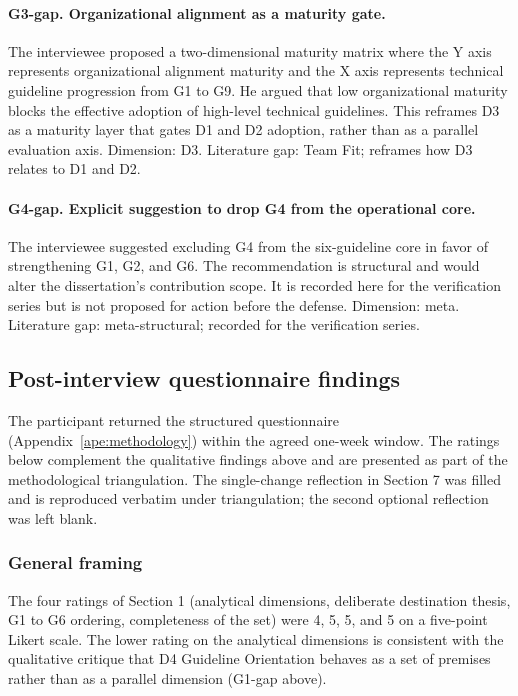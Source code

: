 \paragraph*{G3-gap. Organizational alignment as a maturity gate.} The interviewee proposed a two-dimensional maturity matrix where the Y axis represents organizational alignment maturity and the X axis represents technical guideline progression from G1 to G9. He argued that low organizational maturity blocks the effective adoption of high-level technical guidelines. This reframes D3 as a maturity layer that gates D1 and D2 adoption, rather than as a parallel evaluation axis. Dimension: D3. Literature gap: Team Fit; reframes how D3 relates to D1 and D2.

\paragraph*{G4-gap. Explicit suggestion to drop G4 from the operational core.} The interviewee suggested excluding G4 from the six-guideline core in favor of strengthening G1, G2, and G6. The recommendation is structural and would alter the dissertation's contribution scope. It is recorded here for the verification series but is not proposed for action before the defense. Dimension: meta. Literature gap: meta-structural; recorded for the verification series.

\subsection*{Post-interview questionnaire findings}

The participant returned the structured questionnaire (Appendix~\ref{ape:methodology}) within the agreed one-week window. The ratings below complement the qualitative findings above and are presented as part of the methodological triangulation. The single-change reflection in Section 7 was filled and is reproduced verbatim under triangulation; the second optional reflection was left blank.

\subsubsection*{General framing}

The four ratings of Section 1 (analytical dimensions, deliberate destination thesis, G1 to G6 ordering, completeness of the set) were 4, 5, 5, and 5 on a five-point Likert scale. The lower rating on the analytical dimensions is consistent with the qualitative critique that D4 Guideline Orientation behaves as a set of premises rather than as a parallel dimension (G1-gap above).

